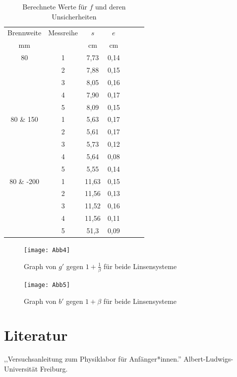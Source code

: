 \documentclass[11pt,a4paper]{article}
\begin{document}
\begin{table}[h]
	\centering
	\begin{tabular*}{0.50\textwidth}{@{\extracolsep{\fill}}cc|ccccc}
		\toprule
		Brennweite & Messreihe & $s$ & $e$   \\
		mm &  & cm & cm  \\
		\bottomrule
		80 & 1 & 7,73 & 0,14 \\
		& 2 & 7,88 & 0,15 \\
		& 3 & 8,05 & 0,16 \\
		& 4 & 7,90 & 0,17 \\
		& 5 & 8,09 & 0,15 \\
		80 \& 150 & 1 & 5,63 & 0,17 \\
		& 2 & 5,61 & 0,17 \\
		& 3 & 5,73 & 0,12 \\
		& 4 & 5,64 & 0,08 \\
		& 5 & 5,55 & 0,14 \\
		80 \& -200 & 1 & 11,63 &0,15 \\
		& 2 & 11,56 & 0,13 \\
		& 3 & 11,52 & 0,16 \\
		& 4 & 11,56 & 0,11 \\
		& 5 & 51,3 & 0,09 \\
		\bottomrule
	\end{tabular*}
	\caption{Berechnete Werte für $f$ und deren Unsicherheiten}
\end{table}

\begin{figure}[h]
	\centering
	\texttt{[image: Abb4]}
	\caption{Graph von $g'$ gegen $1+\frac{1}{\beta}$ für beide Linsensysteme}
\end{figure}

\begin{figure}[h]
	\centering
	\texttt{[image: Abb5]}
	\caption{Graph von $b'$ gegen $1+\beta$ für beide Linsensysteme}
\end{figure}
\section{Literatur}
,,Versuchsanleitung zum Physiklabor für Anfänger*innen.'' Albert-Ludwigs-Universität Freiburg. 
\end{document}
